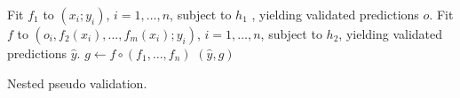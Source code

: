 \begin{algorithm}
    \begin{algorithmic}[1]
            \State Fit $f_1$ to $(x_i; y_i)$, $i = 1, \ldots, n$, subject to $h_1$ , yielding 
                validated predictions $o$.
            \State Fit $f$ to $(o_i, f_2(x_i), \ldots, f_m(x_i); y_i)$, 
                $i = 1, \ldots, n$, subject to $h_2$, yielding validated predictions $\hat{y}$.
            \State $g \gets f \circ (f_1, \ldots, f_n)$
            \State \Return $(\hat{y}, g)$
        \EndFunction
    \end{algorithmic}
    \caption{Nested pseudo validation.} \label{alg:nested-pcv}
\end{algorithm}